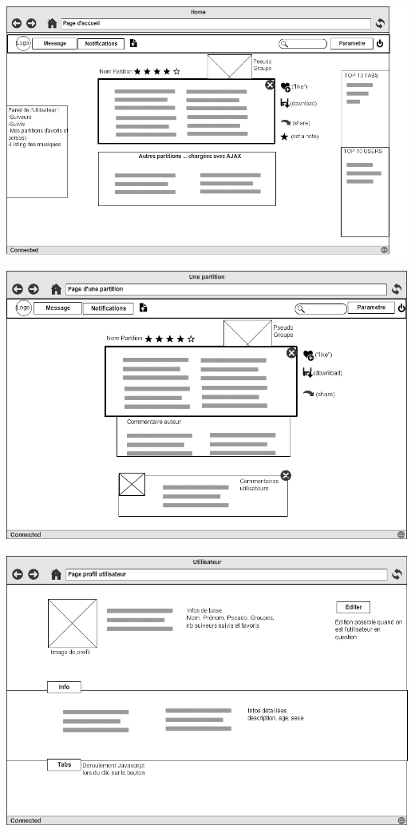 \centerline{\includegraphics[scale=0.6]{Home}}
\centerline{\includegraphics[scale=0.6]{Tab}}
\centerline{\includegraphics[scale=0.6]{User}}

